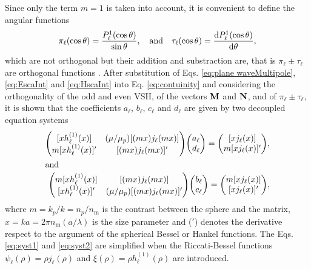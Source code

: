 Since only the term $m=1$ is taken into account, it is convenient to define the angular functions
%
\begin{align}
 \pi_\ell(\cos\theta )  = \frac{P_\ell^1(\cos\theta)}{\sin\theta},\qqtext{and}
 \tau_\ell(\cos\theta) = \dv{P_\ell^1(\cos\theta)}{\theta},
 \label{eq:PiTau}
\end{align}
%
which are not orthogonal but their addition and substraction are, that is $\pi_\ell \pm \tau_\ell$ are orthogonal functions \cite{bohren_absorption_1983}. After substitution  of Eqs. \eqref{eq:plane waveMultipole}, \eqref{eq:EscaInt} and \eqref{eq:HscaInt} into Eq. \eqref{eq:contuinity} and considering the orthogonality of the odd and even VSH, of the vectors $\vb{M}$ and $\vb{N}$, and of $\pi_\ell \pm \tau_\ell$, it is shown that the coefficients $a_\ell$, $b_\ell$, $c_\ell$ and $d_\ell$ are given by two decoupled equation systems
%
\begin{align}
\mqty([x h_\ell^{(1)}(x)]  & (\mu/\mu_p) [(mx) j_\ell(mx)] \\
		m[x h_\ell^{(1)}(x)]' & [(mx) j_\ell(mx)]')
		\mqty(a_\ell \\ d_\ell) = \mqty([xj_\ell(x)] \\ m[x j_\ell(x)]') ,
	\label{eq:syst1}
		\\
\intertext{and}
\mqty( m[xh_\ell^{(1)}(x)]  &  [(mx)j_\ell(mx)] \\
		[x h_\ell^{(1)}(x)]' & (\mu/\mu_p)[(mx) j_\ell(mx)]' )
		\mqty(b_\ell \\ c_\ell) = \mqty(m[xj_\ell(x)] \\ [x j_\ell(x)]'),
	\label{eq:syst2}
\end{align}
%
where $m = k_p / k = n_p / n_\text{m}$ is the contrast between the sphere and the matrix, $x= ka = 2\pi n_\text{m} (a/\lambda)$ is the size parameter and  ($'$) denotes the derivative respect to the argument of the spherical Bessel or Hankel functions. The Eqs. \eqref{eq:syst1} and \eqref{eq:syst2} are simplified when the Riccati-Bessel functions $\psi_\ell( \rho) = \rho j_\ell(\rho)$ and $\xi(\rho) = \rho h_\ell^{(1)}(\rho)$ are introduced.

